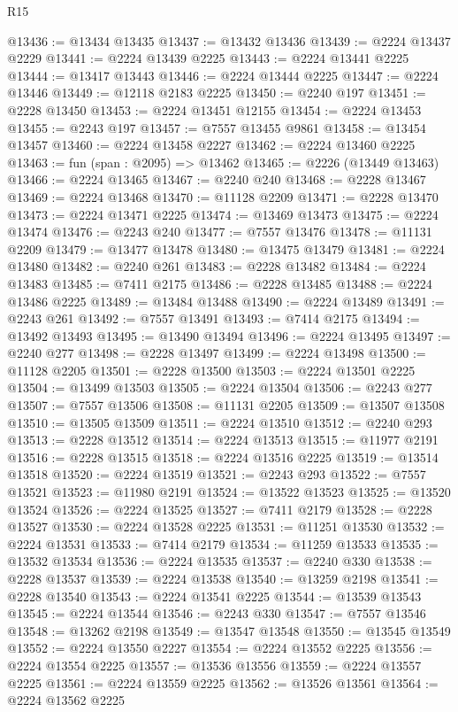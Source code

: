 \begin{lexlean}{R15}
\begin{coremodule}
@13436 := @13434 @13435
@13437 := @13432 @13436
@13439 := @2224 @13437 @2229
@13441 := @2224 @13439 @2225
@13443 := @2224 @13441 @2225
@13444 := @13417 @13443
@13446 := @2224 @13444 @2225
@13447 := @2224 @13446
@13449 := @12118 @2183 @2225
@13450 := @2240 @197
@13451 := @2228 @13450
@13453 := @2224 @13451 @12155
@13454 := @2224 @13453
@13455 := @2243 @197
@13457 := @7557 @13455 @9861
@13458 := @13454 @13457
@13460 := @2224 @13458 @2227
@13462 := @2224 @13460 @2225
@13463 := fun (span : @2095) => @13462
@13465 := @2226 (@13449 @13463)
@13466 := @2224 @13465
@13467 := @2240 @240
@13468 := @2228 @13467
@13469 := @2224 @13468
@13470 := @11128 @2209
@13471 := @2228 @13470
@13473 := @2224 @13471 @2225
@13474 := @13469 @13473
@13475 := @2224 @13474
@13476 := @2243 @240
@13477 := @7557 @13476
@13478 := @11131 @2209
@13479 := @13477 @13478
@13480 := @13475 @13479
@13481 := @2224 @13480
@13482 := @2240 @261
@13483 := @2228 @13482
@13484 := @2224 @13483
@13485 := @7411 @2175
@13486 := @2228 @13485
@13488 := @2224 @13486 @2225
@13489 := @13484 @13488
@13490 := @2224 @13489
@13491 := @2243 @261
@13492 := @7557 @13491
@13493 := @7414 @2175
@13494 := @13492 @13493
@13495 := @13490 @13494
@13496 := @2224 @13495
@13497 := @2240 @277
@13498 := @2228 @13497
@13499 := @2224 @13498
@13500 := @11128 @2205
@13501 := @2228 @13500
@13503 := @2224 @13501 @2225
@13504 := @13499 @13503
@13505 := @2224 @13504
@13506 := @2243 @277
@13507 := @7557 @13506
@13508 := @11131 @2205
@13509 := @13507 @13508
@13510 := @13505 @13509
@13511 := @2224 @13510
@13512 := @2240 @293
@13513 := @2228 @13512
@13514 := @2224 @13513
@13515 := @11977 @2191
@13516 := @2228 @13515
@13518 := @2224 @13516 @2225
@13519 := @13514 @13518
@13520 := @2224 @13519
@13521 := @2243 @293
@13522 := @7557 @13521
@13523 := @11980 @2191
@13524 := @13522 @13523
@13525 := @13520 @13524
@13526 := @2224 @13525
@13527 := @7411 @2179
@13528 := @2228 @13527
@13530 := @2224 @13528 @2225
@13531 := @11251 @13530
@13532 := @2224 @13531
@13533 := @7414 @2179
@13534 := @11259 @13533
@13535 := @13532 @13534
@13536 := @2224 @13535
@13537 := @2240 @330
@13538 := @2228 @13537
@13539 := @2224 @13538
@13540 := @13259 @2198
@13541 := @2228 @13540
@13543 := @2224 @13541 @2225
@13544 := @13539 @13543
@13545 := @2224 @13544
@13546 := @2243 @330
@13547 := @7557 @13546
@13548 := @13262 @2198
@13549 := @13547 @13548
@13550 := @13545 @13549
@13552 := @2224 @13550 @2227
@13554 := @2224 @13552 @2225
@13556 := @2224 @13554 @2225
@13557 := @13536 @13556
@13559 := @2224 @13557 @2225
@13561 := @2224 @13559 @2225
@13562 := @13526 @13561
@13564 := @2224 @13562 @2225

\end{coremodule}
\end{lexlean}
